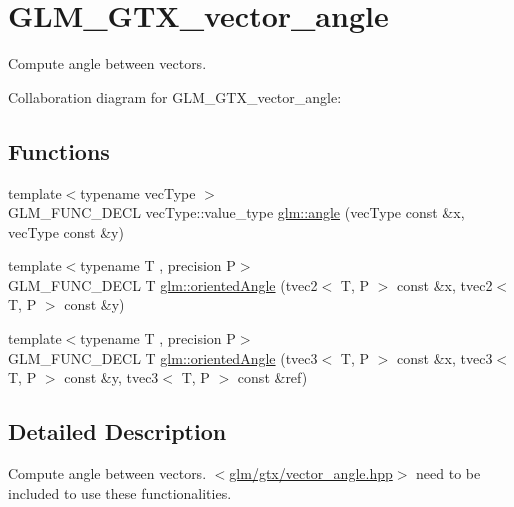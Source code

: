 \hypertarget{group__gtx__vector__angle}{\section{G\-L\-M\-\_\-\-G\-T\-X\-\_\-vector\-\_\-angle}
\label{group__gtx__vector__angle}
}


Compute angle between vectors.  


Collaboration diagram for G\-L\-M\-\_\-\-G\-T\-X\-\_\-vector\-\_\-angle\-:
\subsection*{Functions}
\begin{DoxyCompactItemize}
\item 
{\footnotesize template$<$typename vec\-Type $>$ }\\G\-L\-M\-\_\-\-F\-U\-N\-C\-\_\-\-D\-E\-C\-L vec\-Type\-::value\-\_\-type \hyperlink{group__gtx__vector__angle_gab8691008a2536b681b711211816c14f7}{glm\-::angle} (vec\-Type const \&x, vec\-Type const \&y)
\item 
{\footnotesize template$<$typename T , precision P$>$ }\\G\-L\-M\-\_\-\-F\-U\-N\-C\-\_\-\-D\-E\-C\-L T \hyperlink{group__gtx__vector__angle_ga82a19d474be13c92c7b10caab42a5a72}{glm\-::oriented\-Angle} (tvec2$<$ T, P $>$ const \&x, tvec2$<$ T, P $>$ const \&y)
\item 
{\footnotesize template$<$typename T , precision P$>$ }\\G\-L\-M\-\_\-\-F\-U\-N\-C\-\_\-\-D\-E\-C\-L T \hyperlink{group__gtx__vector__angle_ga7254dba112eff55f55f9544f41cb9ece}{glm\-::oriented\-Angle} (tvec3$<$ T, P $>$ const \&x, tvec3$<$ T, P $>$ const \&y, tvec3$<$ T, P $>$ const \&ref)
\end{DoxyCompactItemize}


\subsection{Detailed Description}
Compute angle between vectors. $<$\hyperlink{vector__angle_8hpp}{glm/gtx/vector\-\_\-angle.\-hpp}$>$ need to be included to use these functionalities. 

